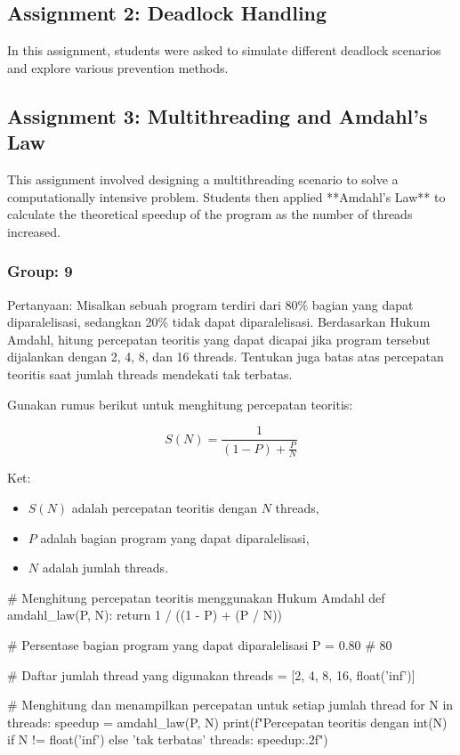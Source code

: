 \documentclass[12pt]{article}
\begin{document}
\subsection{Assignment 2: Deadlock Handling}
In this assignment, students were asked to simulate different deadlock scenarios and explore various prevention methods.

\subsection{Assignment 3: Multithreading and Amdahl's Law}
This assignment involved designing a multithreading scenario to solve a computationally intensive problem. Students then applied **Amdahl's Law** to calculate the theoretical speedup of the program as the number of threads increased.
\subsubsection{Group: 9}
Pertanyaan:
Misalkan sebuah program terdiri dari 80\% bagian yang dapat diparalelisasi, sedangkan 20\% tidak dapat diparalelisasi. Berdasarkan Hukum Amdahl, hitung percepatan teoritis yang dapat dicapai jika program tersebut dijalankan dengan 2, 4, 8, dan 16 threads. Tentukan juga batas atas percepatan teoritis saat jumlah threads mendekati tak terbatas.

Gunakan rumus berikut untuk menghitung percepatan teoritis:

\[
S(N) = \frac{1}{(1 - P) + \frac{P}{N}}
\]

Ket:
\begin{itemize}
    \item \( S(N) \) adalah percepatan teoritis dengan \( N \) threads,
    \item \( P \) adalah bagian program yang dapat diparalelisasi,
    \item \( N \) adalah jumlah threads.
\end{itemize}

\begin{python}
    # Menghitung percepatan teoritis menggunakan Hukum Amdahl
def amdahl_law(P, N):
    return 1 / ((1 - P) + (P / N))

# Persentase bagian program yang dapat diparalelisasi
P = 0.80  # 80%

# Daftar jumlah thread yang digunakan
threads = [2, 4, 8, 16, float('inf')]

# Menghitung dan menampilkan percepatan untuk setiap jumlah thread
for N in threads:
    speedup = amdahl_law(P, N)
    print(f"Percepatan teoritis dengan {int(N) if N != float('inf') else 'tak terbatas'} threads: {speedup:.2f}")
\end{python}
\end{document}
